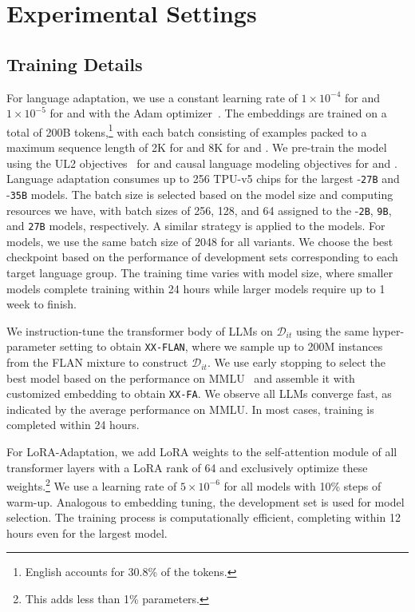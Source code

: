 \section{Experimental Settings}\label{appendix:exp_settings}
\subsection{Training Details}\label{appendix:training_details}
For language adaptation, we use a constant learning rate of $1\times 10^{-4}$ for \palmtwo and $1\times 10^{-5}$ for \gemmatwo and \aya with the Adam optimizer~\citep{kingma2014adam}. The embeddings are trained on a total of 200B tokens,\footnote{English accounts for 30.8\% of the tokens.} with each batch consisting of examples packed to a maximum sequence length of 2K for \palmtwo and 8K for \gemmatwo and \aya. We pre-train the model using the UL2 objectives~\citep{tay2023ul} for \palmtwo and causal language modeling objectives for \gemmatwo and \aya. Language adaptation consumes up to 256 TPU-v5 chips for the largest \gemmatwo-\texttt{27B} and \aya-\texttt{35B} models. The batch size is selected based on the model size and computing resources we have, with batch sizes of 256, 128, and 64 assigned to the \gemmatwo-\texttt{2B}, \texttt{9B}, and \texttt{27B} models, respectively. A similar strategy is applied to the \aya models. For \palmtwo models, we use the same batch size of 2048 for all variants. We choose the best checkpoint based on the performance of \flores development sets corresponding to each target language group. The training time varies with model size, where smaller models complete training within 24 hours while larger models require up to 1 week to finish.

We instruction-tune the transformer body of LLMs on $\mathcal{D}_{it}$ using the same hyper-parameter setting to obtain \texttt{XX-FLAN}, where we sample up to 200M instances from the FLAN mixture to construct $\mathcal{D}_{it}$. We use early stopping to select the best model based on the performance on MMLU~\citep{hendrycks2021measuring} and assemble it with customized embedding to obtain \texttt{XX-FA}. We observe all LLMs converge fast, as indicated by the average performance on MMLU. In most cases, training is completed within 24 hours.

For LoRA-Adaptation, we add LoRA weights to the self-attention module of all transformer layers with a LoRA rank of 64 and exclusively optimize these weights.\footnote{This adds less than 1\% parameters.} We use a learning rate of $5\times 10^{-6}$ for all models with 10\% steps of warm-up. Analogous to embedding tuning, the \flores development set is used for model selection. The training process is computationally efficient, completing within 12 hours even for the largest model.

